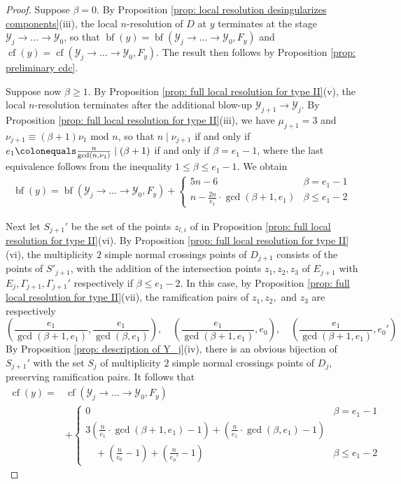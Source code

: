 \documentclass[12pt]{amsart}
\numberwithin{equation}{section}
\theoremstyle{definition}
\newcommand{\Y}{\mathcal{Y}}
\newcommand{\tx}[1]{\text{#1}}
\DeclareMathOperator{\blf}{bf}
\DeclareMathOperator{\cf}{cf}
\begin{document}
\begin{proof} 
    Suppose $\beta=0$. By Proposition \ref{prop: local resolution desingularizes components}(iii), the local $n$-resolution of $D$ at $y$ terminates at the stage $\Y_j\to...\to\Y_0$, so that $\blf(y)=\blf(\Y_j\to...\to\Y_0,F_y)$ and $\cf(y)=\cf(\Y_j\to...\to\Y_0,F_y)$. The result then follows by Proposition \ref{prop: preliminary cdc}.
    
    Suppose now $\beta\geq 1$. By Proposition \ref{prop: full local resolution for type II}(v), the local $n$-resolution terminates after the additional blow-up $\Y_{j+1}\to\Y_j$. By Proposition \ref{prop: full local resolution for type II}(iii), we have $\mu_{j+1}=3$ and $\nu_{j+1}\equiv(\beta+1)\nu_1\tx{ mod }n$, so that $n\mid\nu_{j+1}$ if and only if $e_1\colonequals\frac{n}{\gcd(n,\nu_1)}\mid(\beta+1)$ if and only if $\beta=e_1-1$, where the last equivalence follows from the inequality $1\leq\beta\leq e_1-1$. We obtain
    \begin{align}\label{eq: Type II bf}
        \blf(y)=\blf(\Y_j\to...\to\Y_0,F_y)+\begin{cases}
        5n-6&\beta=e_1-1\\
        n-\frac{2n}{e_1}\cdot\gcd(\beta+1,e_1)&\beta\leq e_1-2
        \end{cases}
    \end{align}

    Next let $S_{j+1}'$ be the set of the points $z_{l,i}$ of in Proposition \ref{prop: full local resolution for type II}(vi). By Proposition \ref{prop: full local resolution for type II}(vi), the multiplicity $2$ simple normal crossings points of $D_{j+1}$ consists of the points of $S'_{j+1}$, with the addition of the intersection points $z_1,z_2,z_3$ of $E_{j+1}$ with $E_j,\Gamma_{j+1},\Gamma_{j+1}'$ respectively if $\beta\leq e_1-2$. In this case, by Proposition \ref{prop: full local resolution for type II}(vii), the ramification pairs of $z_1,z_2,$ and $z_3$ are respectively
    \[(\frac{e_1}{\gcd(\beta+1,e_1)},\frac{e_1}{\gcd(\beta,e_1)}),\quad(\frac{e_1}{\gcd(\beta+1,e_1)},e_0),\quad (\frac{e_1}{\gcd(\beta+1,e_1)},e_0')\]
    By Proposition \ref{prop: description of Y_j}(iv), there is an obvious bijection of $S_{j+1}'$ with the set $S_j$ of multiplicity $2$ simple normal crossings points of $D_j$, preserving ramification pairs. It follows that
    \begin{equation}\label{eq: Type II cf}
    \begin{aligned}
        \cf(y)=&\cf(\Y_j\to...\to\Y_0,F_y)\\
        &+\begin{cases}
        0&\beta=e_1-1\\
        3(\frac{n}{e_1}\cdot\gcd(\beta+1,e_1)-1)+(\frac{n}{e_1}\cdot\gcd(\beta,e_1)-1)&\\
        \quad+(\frac{n}{e_0}-1)+(\frac{n}{e_0'}-1)&\beta\leq e_1-2
        \end{cases}
    \end{aligned}
    \end{equation}


\end{proof}
\end{document}
